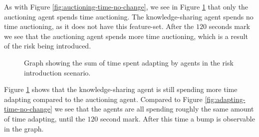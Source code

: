 As with Figure \ref{fig:auctioning-time-no-change}, we see in Figure \ref{fig:adapting-time-risk-introduction} that only the auctioning agent spends time auctioning. The knowledge-sharing agent spends no time auctioning, as it does not have this feature-set. After the $120$ seconds mark we see that the auctioning agent spends more time auctioning, which is a result of the risk being introduced.

\begin{figure}[H]
    \hspace*{-1.2cm}
    \centering
        
    \caption{Graph showing the sum of time spent adapting by agents in the risk introduction scenario.}
    \label{fig:adapting-time-risk-introduction}
\end{figure}

Figure \ref{fig:adapting-time-risk-introduction} shows that the knowledge-sharing agent is still spending more time adapting compared to the auctioning agent. Compared to Figure \ref{fig:adapting-time-no-change} we see that the agents are all spending roughly the same amount of time adapting, until the $120$ second mark. After this time a bump is observable in the graph.
